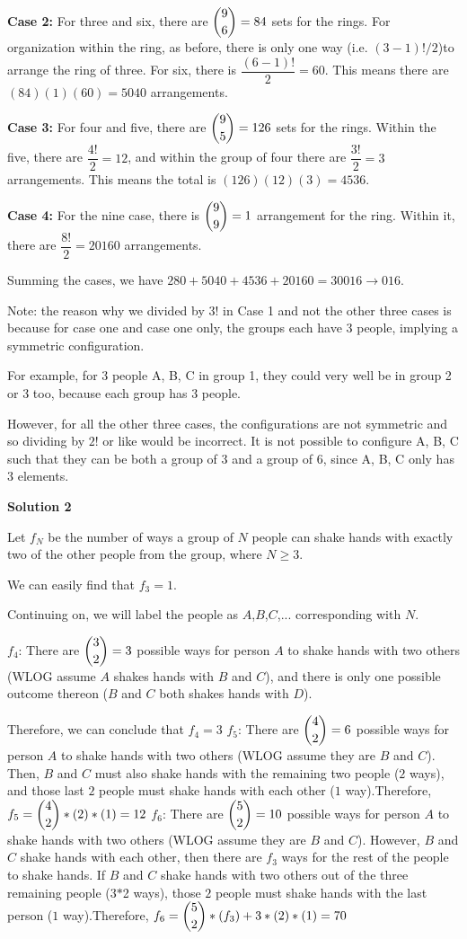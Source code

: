 \begin{enumerate}
 \textbf{Case 2:}  For three and six, there are $\dbinom{9}{6}=84$ sets for the rings.  For organization within the ring, as before, there is only one way (i.e. $(3-1)!/2$)to arrange the ring of three.  For six, there is $\dfrac{(6-1)!}{2}=60$.  This means there are $(84)(1)(60)=5040$ arrangements.

 \textbf{Case 3:}  For four and five, there are $\dbinom{9}{5}=126$ sets for the rings.  Within the five, there are $\dfrac{4!}{2}=12$, and within the group of four there are $\dfrac{3!}{2}=3$ arrangements.  This means the total is $(126)(12)(3)=4536$.

 \textbf{Case 4:}  For the nine case, there is $\dbinom{9}{9}=1$ arrangement for the ring.  Within it, there are $\dfrac{8!}{2}=20160$ arrangements.

 Summing the cases, we have $280+5040+4536+20160=30016 \to \boxed{016}$.

 Note: the reason why we divided by $3!$ in Case 1 and not the other three cases is because for case one and case one only, the groups each have 3 people, implying a symmetric configuration. 

 For example, for 3 people A, B, C in group 1, they could very well be in group 2 or 3 too, because each group has 3 people. 

 However, for all the other three cases, the configurations are not symmetric and so dividing by $2!$ or like would be incorrect. It is not possible to configure A, B, C such that they can be both a group of 3 and a group of 6, since {A, B, C} only has 3 elements. 

 



\textbf{Solution 2}

Let $f_N$ be the number of ways a group of $N$ people can shake hands with exactly two of the other people from the group, where $N \ge 3$.

 We can easily find that $f_3=1$.

 Continuing on, we will label the people as $A$,$B$,$C$,... corresponding with $N$.

 $f_4$: There are $\dbinom{3}{2}=3$ possible ways for person $A$ to shake hands with two others (WLOG assume $A$ shakes hands with $B$ and $C$), and there is only one possible outcome thereon ($B$ and $C$ both shakes hands with $D$).

 Therefore, we can conclude that $f_4=3$
$f_5$: There are $\dbinom{4}{2}=6$ possible ways for person $A$ to shake hands with two others (WLOG assume they are $B$ and $C$). Then, $B$ and $C$ must also shake hands with the remaining two people ($2$ ways), and those last $2$ people must shake hands with each other ($1$ way).Therefore, $f_5=\dbinom{4}{2}\ast(2)\ast(1)=12$
$f_6$: There are $\dbinom{5}{2}=10$ possible ways for person $A$ to shake hands with two others (WLOG assume they are $B$ and $C$). However, $B$ and $C$ shake hands with each other, then there are $f_3$ ways for the rest of the people to shake hands. If $B$ and $C$ shake hands with two others out of the three remaining people (3$\ast$2 ways), those $2$ people must shake hands with the last person ($1$ way).Therefore, $f_6=\dbinom{5}{2}\ast(f_3)+3\ast(2)\ast(1)=70$


\end{enumerate}

